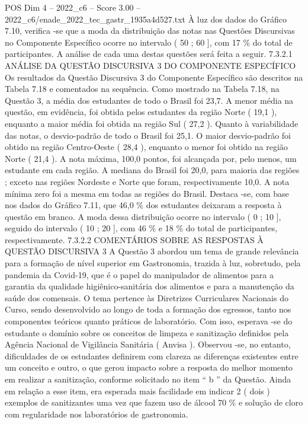 \begin{textsample}{POS Dim 4 – 2022\_c6 – Score 3.00 – 2022\_c6/enade\_2022\_tec\_gastr\_1935a4d527.txt}
À luz dos dados do Gráfico 7.10, verifica -se que a moda da distribuição das notas nas Questões Discursivas no Componente Específico ocorre no intervalo ( 50 ; 60 ], com 17 \% do total de participantes.
A análise de cada uma destas questões será feita a seguir. 7.3.2.1 ANÁLISE DA QUESTÃO DISCURSIVA 3 DO COMPONENTE ESPECÍFICO Os resultados da Questão Discursiva 3 do Componente Específico são descritos na Tabela 7.18 e comentados na sequência.
Como mostrado na Tabela 7.18, na Questão 3, a média dos estudantes de todo o Brasil foi 23,7.
A menor média na questão, em evidência, foi obtida pelos estudantes da região Norte ( 19,1 ), enquanto a maior média foi obtida na região Sul ( 27,2 ).
Quanto à variabilidade das notas, o desvio-padrão de todo o Brasil foi 25,1.
O maior desvio-padrão foi obtido na região Centro-Oeste ( 28,4 ), enquanto o menor foi obtido na região Norte ( 21,4 ).
A nota máxima, 100,0 pontos, foi alcançada por, pelo menos, um estudante em cada região.
A mediana do Brasil foi 20,0, para maioria das regiões ; exceto nas regiões Nordeste e Norte que foram, respectivamente 10,0.
A nota mínima zero foi a mesma em todas as regiões do Brasil.
Destaca -se, com base nos dados do Gráfico 7.11, que 46,0 \% dos estudantes deixaram a resposta à questão em branco.
A moda dessa distribuição ocorre no intervalo ( 0 ; 10 ], seguido do intervalo ( 10 ; 20 ], com 46 \% e 18 \% do total de participantes, respectivamente. 7.3.2.2 COMENTÁRIOS SOBRE AS RESPOSTAS À QUESTÃO DISCURSIVA 3 A Questão 3 abordou um tema de grande relevância para a formação de nível superior em Gastronomia, trazida à luz, sobretudo, pela pandemia da Covid-19, que é o papel do manipulador de alimentos para a garantia da qualidade higiênico-sanitária dos alimentos e para a manutenção da saúde dos comensais.
O tema pertence às Diretrizes Curriculares Nacionais do Curso, sendo desenvolvido ao longo de toda a formação dos egressos, tanto nos componentes teóricos quanto práticos de laboratório.
Com isso, esperava -se do estudante o domínio sobre os conceitos de limpeza e sanitização definidos pela Agência Nacional de Vigilância Sanitária ( Anvisa ).
Observou -se, no entanto, dificuldades de os estudantes definirem com clareza as diferenças existentes entre um conceito e outro, o que gerou impacto sobre a resposta do melhor momento em realizar a sanitização, conforme solicitado no item “ b ” da Questão.
Ainda em relação a esse item, era esperada mais facilidade em indicar 2 ( dois ) exemplos de sanitizantes uma vez que fazem uso de álcool 70 \% e solução de cloro com regularidade nos laboratórios de gastronomia.

\end{textsample}
